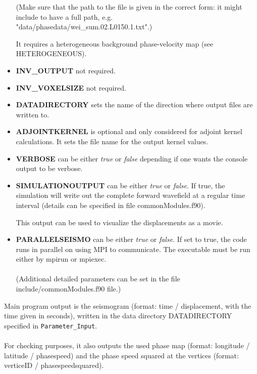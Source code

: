 \documentclass[a4paper,
                          headsepline,
                          listof=totoc,
                          toc=listof,
                          headings=small]{scrreprt} %
\begin{document}
\begin{itemize}
(Make sure that the path to the file is given in the correct form: it might include to have a full path, e.g.\\
"data/phasedata/wei\_sum.02.L0150.1.txt".)


It requires a heterogeneous background phase-velocity map
(see HETEROGENEOUS).


\item \textbf{INV\_OUTPUT}
not required.

\item \textbf{INV\_VOXELSIZE}
not required.

\item \textbf{DATADIRECTORY}
sets the name of the direction where output files are written to.

\item \textbf{ADJOINTKERNEL}
is optional and only considered for adjoint kernel calculations. It sets the file name
for the output kernel values.

\item \textbf{VERBOSE}
can be either \textit{true} or \textit{false} depending if one wants the console output to be verbose.

\item \textbf{SIMULATIONOUTPUT}
can be either \textit{true} or \textit{false}. If true, the simulation will write out the
complete forward wavefield at a regular time
interval (details can be specified in file commonModules.f90).

This output can be used to visualize the displacements as a movie.

\item \textbf{PARALLELSEISMO}
can be either \textit{true} or \textit{false}. If set to true, the code runs in parallel on using MPI
to communicate. The executable must be run either by mpirun or mpiexec.
\\
\\
(Additional detailed parameters can be set
in the file include/commonModules.f90 file.)

\end{itemize}


Main program output is the seismogram (format: time / displacement, with the
time given in seconds),
written in the data directory DATADIRECTORY specified in \texttt{Parameter\_Input}.
\\
\\
For checking purposes, it also outputs the used phase map
(format: longitude / latitude / phasespeed)
and the phase speed squared at the vertices
(format: verticeID / phasespeedsquared).
\end{document}
